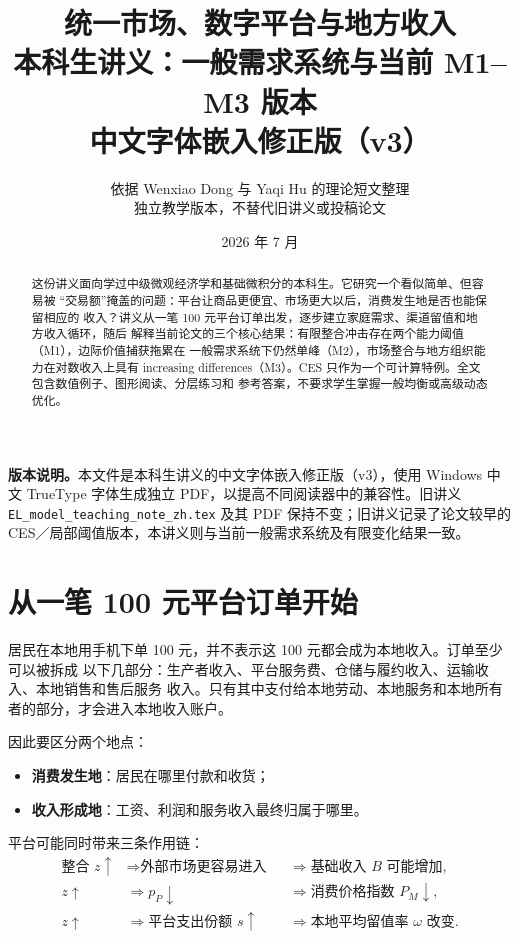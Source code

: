 \documentclass[UTF8,11pt,scheme=chinese,fontset=windows]{ctexart}
\title{\textbf{统一市场、数字平台与地方收入}\\[0.45em]
\large 本科生讲义：一般需求系统与当前 M1--M3 版本\\[0.3em]
\normalsize 中文字体嵌入修正版（v3）}
\author{依据 Wenxiao Dong 与 Yaqi Hu 的理论短文整理\\
\small 独立教学版本，不替代旧讲义或投稿论文}
\date{2026 年 7 月}
\theoremstyle{definition}
\begin{document}
\maketitle

\begin{abstract}
这份讲义面向学过中级微观经济学和基础微积分的本科生。它研究一个看似简单、但容易被
“交易额”掩盖的问题：平台让商品更便宜、市场更大以后，消费发生地是否也能保留相应的
收入？讲义从一笔 100 元平台订单出发，逐步建立家庭需求、渠道留值和地方收入循环，随后
解释当前论文的三个核心结果：有限整合冲击存在两个能力阈值（M1），边际价值捕获拖累在
一般需求系统下仍然单峰（M2），市场整合与地方组织能力在对数收入上具有 increasing
differences（M3）。CES 只作为一个可计算特例。全文包含数值例子、图形阅读、分层练习和
参考答案，不要求学生掌握一般均衡或高级动态优化。
\end{abstract}

\noindent\textbf{版本说明。}本文件是本科生讲义的中文字体嵌入修正版（v3），使用
Windows 中文 TrueType 字体生成独立 PDF，以提高不同阅读器中的兼容性。旧讲义
\texttt{EL\_model\_teaching\_note\_zh.tex} 及其 PDF 保持不变；旧讲义记录了论文较早的
CES／局部阈值版本，本讲义则与当前一般需求系统及有限变化结果一致。

\tableofcontents
\clearpage

\section{从一笔 100 元平台订单开始}

居民在本地用手机下单 100 元，并不表示这 100 元都会成为本地收入。订单至少可以被拆成
以下几部分：生产者收入、平台服务费、仓储与履约收入、运输收入、本地销售和售后服务
收入。只有其中支付给本地劳动、本地服务和本地所有者的部分，才会进入本地收入账户。

因此要区分两个地点：
\begin{itemize}
  \item \textbf{消费发生地}：居民在哪里付款和收货；
  \item \textbf{收入形成地}：工资、利润和服务收入最终归属于哪里。
\end{itemize}

平台可能同时带来三条作用链：
\[
\boxed{
\begin{aligned}
\text{整合 }z\uparrow
&\Longrightarrow \text{外部市场更容易进入}
&&\Longrightarrow \text{基础收入 }B\text{ 可能增加},\\
z\uparrow
&\Longrightarrow p_P\downarrow
&&\Longrightarrow \text{消费价格指数 }P_M\downarrow,\\
z\uparrow
&\Longrightarrow \text{平台支出份额 }s\uparrow
&&\Longrightarrow \text{本地平均留值率 }\omega\text{ 改变}.
\end{aligned}}
\]
\end{document}
